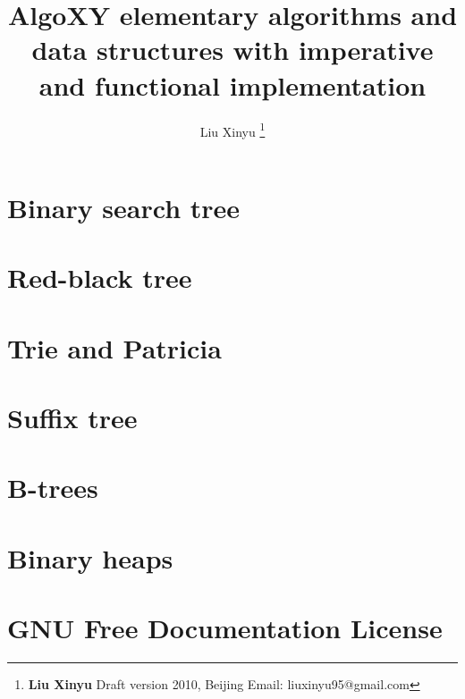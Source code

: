 \documentclass[a4paper,twoside]{book} %
\begin{document}


\title{{\bf \Huge AlgoXY} elementary algorithms and data structures \newline
            with imperative and functional implementation \newline
            \newline
            }

\author{Liu Xinyu
  \thanks{{\bfseries Liu Xinyu } \newline
    Draft version 2010, Beijing \newline
    Email: liuxinyu95@gmail.com \newline
    }}

\maketitle


\tableofcontents
\newpage

\part{Binary search tree}


\part{Red-black tree}


\part{Trie and Patricia}


\part{Suffix tree}


\part{B-trees}


\part{Binary heaps}


\part{GNU Free Documentation License}

\end{document}
